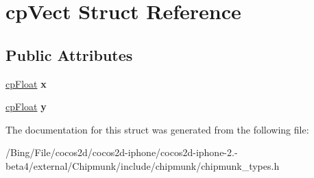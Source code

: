 \hypertarget{structcp_vect}{\section{cp\-Vect Struct Reference}
\label{structcp_vect}
}
\subsection*{Public Attributes}
\begin{DoxyCompactItemize}
\item 
\hypertarget{structcp_vect_a16371845f9474f321d137615edfc16ad}{\hyperlink{group__basic_types_gac1ed65573e035bf892505768c852d8d3}{cp\-Float} {\bfseries x}}\label{structcp_vect_a16371845f9474f321d137615edfc16ad}

\item 
\hypertarget{structcp_vect_afe915cf8f8e2694cdad97f0ce33bd4fd}{\hyperlink{group__basic_types_gac1ed65573e035bf892505768c852d8d3}{cp\-Float} {\bfseries y}}\label{structcp_vect_afe915cf8f8e2694cdad97f0ce33bd4fd}

\end{DoxyCompactItemize}


The documentation for this struct was generated from the following file\-:\begin{DoxyCompactItemize}
\item 
/\-Bing/\-File/cocos2d/cocos2d-\/iphone/cocos2d-\/iphone-\/2.-\/beta4/external/\-Chipmunk/include/chipmunk/chipmunk\-\_\-types.\-h\end{DoxyCompactItemize}
